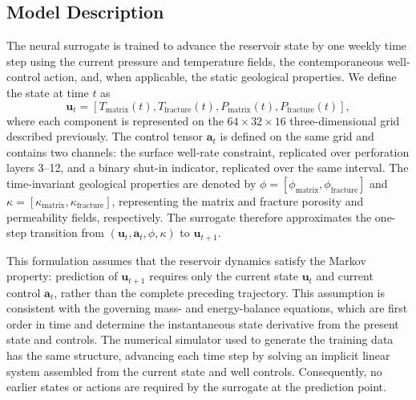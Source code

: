 \documentclass[pdflatex,sn-mathphys-ay]{sn-jnl}
\newcommand{\svec}{\mathbf{u}}            %
\newcommand{\action}{\mathbf{a}}           %
\begin{document}
  \subsection{Model Description}
\label{sec:arch}

The neural surrogate is trained to advance the reservoir state by one weekly time
step using the current pressure and temperature fields, the contemporaneous
well-control action, and, when applicable, the static geological properties. We
define the state at time \(t\) as
\[
  \svec_t =
  [T_{\text{matrix}}(t), T_{\text{fracture}}(t),
   P_{\text{matrix}}(t), P_{\text{fracture}}(t)],
\]
where each component is represented on the \(64 \times 32 \times 16\)
three-dimensional grid described previously. The control tensor \(\action_t\) is
defined on the same grid and contains two channels: the surface well-rate
constraint, replicated over perforation layers 3--12, and a binary shut-in
indicator, replicated over the same interval. The time-invariant geological
properties are denoted by
\(\phi=[\phi_{\text{matrix}},\phi_{\text{fracture}}]\) and
\(\kappa=[\kappa_{\text{matrix}},\kappa_{\text{fracture}}]\), representing the
matrix and fracture porosity and permeability fields, respectively. The
surrogate therefore approximates the one-step transition from
\((\svec_t,\action_t,\phi,\kappa)\) to \(\svec_{t+1}\).

This formulation assumes that the reservoir dynamics satisfy the Markov
property: prediction of \(\svec_{t+1}\) requires only the current state
\(\svec_t\) and current control \(\action_t\), rather than the complete preceding
trajectory. This assumption is consistent with the governing mass- and
energy-balance equations, which are first order in time and determine the
instantaneous state derivative from the present state and controls. The
numerical simulator used to generate the training data has the same structure,
advancing each time step by solving an implicit linear system assembled from
the current state and well controls. Consequently, no earlier states or actions
are required by the surrogate at the prediction point.
\end{document}
